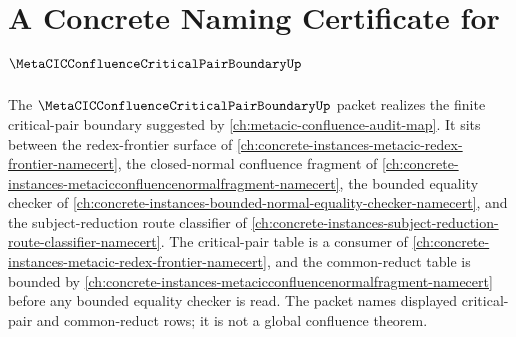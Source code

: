 \chapter{A Concrete Naming Certificate for $\MetaCICConfluenceCriticalPairBoundaryUp$}
\label{ch:concrete-instances-metacic-confluence-critical-pair-boundary-namecert}

The $\MetaCICConfluenceCriticalPairBoundaryUp$ packet realizes the finite
critical-pair boundary suggested by
\autoref{ch:metacic-confluence-audit-map}. It sits between the redex-frontier
surface of \autoref{ch:concrete-instances-metacic-redex-frontier-namecert},
the closed-normal confluence fragment of
\autoref{ch:concrete-instances-metacicconfluencenormalfragment-namecert}, the
bounded equality checker of
\autoref{ch:concrete-instances-bounded-normal-equality-checker-namecert}, and
the subject-reduction route classifier of
\autoref{ch:concrete-instances-subject-reduction-route-classifier-namecert}.
The critical-pair table is a consumer of
\autoref{ch:concrete-instances-metacic-redex-frontier-namecert}, and the
common-reduct table is bounded by
\autoref{ch:concrete-instances-metacicconfluencenormalfragment-namecert}
before any bounded equality checker is read.
The packet names displayed critical-pair and common-reduct rows; it is not a
global confluence theorem.




